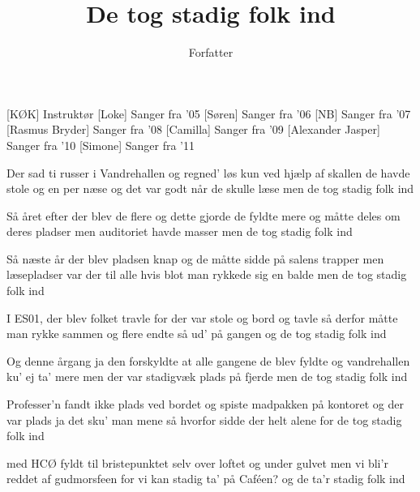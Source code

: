 \documentclass[a4paper,11pt]{article}
\title{De tog stadig folk ind}
\author{Forfatter}
\begin{document}
\maketitle

\begin{roles}
[KØK] Instruktør
[Loke] Sanger fra '05
[Søren] Sanger fra '06
[NB] Sanger fra '07
[Rasmus Bryder] Sanger fra '08
[Camilla] Sanger fra '09
[Alexander Jasper] Sanger fra '10
[Simone] Sanger fra '11
\end{roles}

\begin{song}
 Der sad ti russer i Vandrehallen
og regned' løs kun ved hjælp af skallen
de havde stole og en per næse
og det var godt når de skulle læse
men de tog stadig folk ind

 Så året efter der blev de flere
og dette gjorde de fyldte mere
og måtte deles om deres pladser
men auditoriet havde masser
men de tog stadig folk ind

 Så næste år der blev pladsen knap og
de måtte sidde på salens trapper
men læsepladser var der til alle
hvis blot man rykkede sig en balde
men de tog stadig folk ind

 I ES01, der blev folket travle
for der var stole og bord og tavle
så derfor måtte man rykke sammen
og flere endte så ud' på gangen
og de tog stadig folk ind

 Og denne årgang ja den forskyldte
at alle gangene de blev fyldte
og vandrehallen ku' ej ta' mere
men der var stadigvæk plads på fjerde
men de tog stadig folk ind

 Professer'n fandt ikke plads ved bordet
og spiste madpakken på kontoret
og der var plads ja det sku' man mene
så hvorfor sidde der helt alene
for de tog stadig folk ind

 med HCØ fyldt til bristepunktet
selv over loftet og under gulvet
men vi bli'r reddet af gudmorsfeen
for vi kan stadig ta' på Caféen?
og de ta'r stadig folk ind
\end{song}
\end{document}
